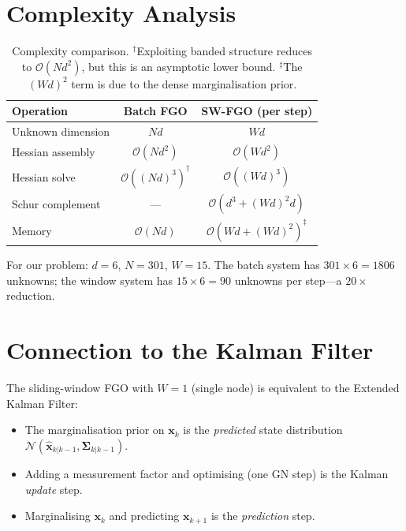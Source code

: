 \documentclass[11pt,a4paper]{article}
\newcommand{\bx}{\bm{x}}
\newcommand{\bSigma}{\bm{\Sigma}}
\theoremstyle{definition}
\theoremstyle{plain}
\begin{document}
\section{Complexity Analysis}
\label{sec:complexity}

\begin{table}[h!]
\centering
\begin{tabular}{lcc}
\toprule
\textbf{Operation} & \textbf{Batch FGO} & \textbf{SW-FGO (per step)} \\
\midrule
Unknown dimension   & $Nd$               & $Wd$ \\
Hessian assembly    & $\mathcal{O}(Nd^2)$  & $\mathcal{O}(Wd^2)$ \\
Hessian solve       & $\mathcal{O}((Nd)^3)^\dagger$
                    & $\mathcal{O}((Wd)^3)$ \\
Schur complement    & ---                & $\mathcal{O}(d^3 + (Wd)^2 d)$ \\
Memory              & $\mathcal{O}(Nd)$  & $\mathcal{O}(Wd + (Wd)^2)^\ddagger$ \\
\bottomrule
\end{tabular}
\caption{Complexity comparison.  $^\dagger$Exploiting banded structure
  reduces to $\mathcal{O}(Nd^2)$, but this is an asymptotic lower bound.
  $^\ddagger$The $(Wd)^2$ term is due to the dense marginalisation prior.}
\label{tab:complexity}
\end{table}

For our problem: $d = 6$, $N = 301$, $W = 15$.  The batch system has
$301 \times 6 = 1806$ unknowns; the window system has $15 \times 6 = 90$
unknowns per step—a $20\times$ reduction.

\section{Connection to the Kalman Filter}
\label{sec:kalman}

The sliding-window FGO with $W = 1$ (single node) is equivalent
to the Extended Kalman Filter:
\begin{itemize}
  \item The marginalisation prior on $\bx_k$ is the \emph{predicted}
    state distribution $\mathcal{N}(\hat{\bx}_{k|k-1}, \bSigma_{k|k-1})$.
  \item Adding a measurement factor and optimising (one GN step)
    is the Kalman \emph{update} step.
  \item Marginalising $\bx_k$ and predicting $\bx_{k+1}$ is the
    \emph{prediction} step.
\end{itemize}
\end{document}

